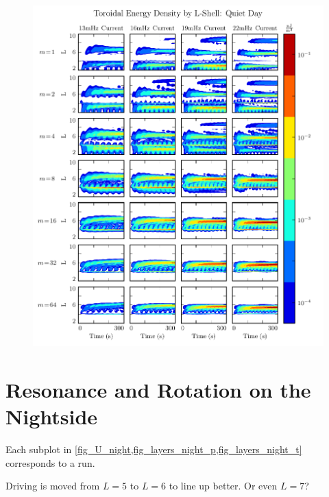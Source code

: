 \begin{figure}[!htb]
    \centering
    \includegraphics[width=\textwidth]{figures/layers_day_t.pdf}
    \caption[Dayside Toroidal Energy Distribution]{
      \todo{$\cdots$}
    }
    \label{fig_layers_day_t}
\end{figure}

\section{Resonance and Rotation on the Nightside}
  \label{sec_night}

Each subplot in \cref{fig_U_night,fig_layers_night_p,fig_layers_night_t} corresponds to a run. 

Driving is moved from $L=5$ to $L=6$ to line up better. Or even $L=7$?


